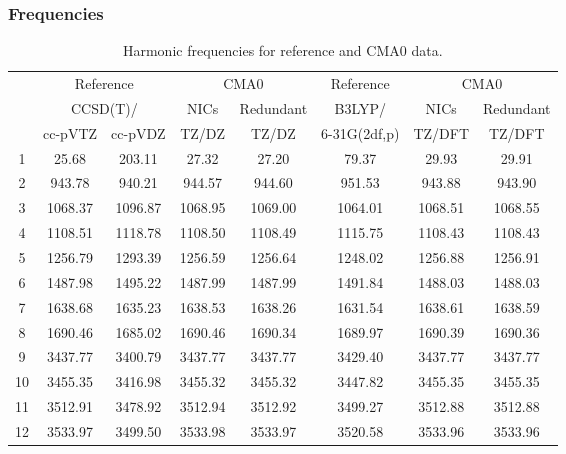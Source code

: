 \documentclass[10pt,oneside]{article}
\begin{document}
\begin{table}[h!]
\subsubsection*{Frequencies}
\centering
\caption{Harmonic frequencies for reference and CMA0 data.}
\begin{tabular}{cccccccc}
\toprule
{} & \multicolumn{2}{c}{Reference} & \multicolumn{2}{c}{CMA0} &    Reference & \multicolumn{2}{c}{CMA0} \\
{} & \multicolumn{2}{c}{CCSD(T)/} &    NICs &  Redundant &       B3LYP/ &    NICs & Redundant \\
{} &   cc-pVTZ & cc-pVDZ &   TZ/DZ &      TZ/DZ & 6-31G(2df,p) &  TZ/DFT &    TZ/DFT \\
\midrule
1  &     25.68 &  203.11 &   27.32 &      27.20 &        79.37 &   29.93 &     29.91 \\
2  &    943.78 &  940.21 &  944.57 &     944.60 &       951.53 &  943.88 &    943.90 \\
3  &   1068.37 & 1096.87 & 1068.95 &    1069.00 &      1064.01 & 1068.51 &   1068.55 \\
4  &   1108.51 & 1118.78 & 1108.50 &    1108.49 &      1115.75 & 1108.43 &   1108.43 \\
5  &   1256.79 & 1293.39 & 1256.59 &    1256.64 &      1248.02 & 1256.88 &   1256.91 \\
6  &   1487.98 & 1495.22 & 1487.99 &    1487.99 &      1491.84 & 1488.03 &   1488.03 \\
7  &   1638.68 & 1635.23 & 1638.53 &    1638.26 &      1631.54 & 1638.61 &   1638.59 \\
8  &   1690.46 & 1685.02 & 1690.46 &    1690.34 &      1689.97 & 1690.39 &   1690.36 \\
9  &   3437.77 & 3400.79 & 3437.77 &    3437.77 &      3429.40 & 3437.77 &   3437.77 \\
10 &   3455.35 & 3416.98 & 3455.32 &    3455.32 &      3447.82 & 3455.35 &   3455.35 \\
11 &   3512.91 & 3478.92 & 3512.94 &    3512.92 &      3499.27 & 3512.88 &   3512.88 \\
12 &   3533.97 & 3499.50 & 3533.98 &    3533.97 &      3520.58 & 3533.96 &   3533.96 \\
\bottomrule
\end{tabular}
\end{table}
\end{document}
